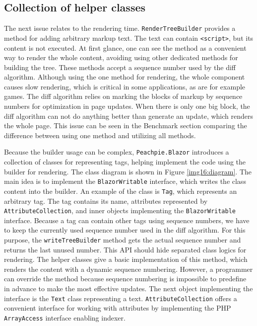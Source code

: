 \subsection{Collection of helper classes}

The next issue relates to the rendering time.
\texttt{RenderTreeBuilder} provides a method for adding arbitrary markup text.
The text can contain \texttt{<script>}, but its content is not executed.
At first glance, one can see the method as a convenient way to render the whole content, avoiding using other dedicated methods for building the tree.
These methods accept a sequence number used by the diff algorithm. 
Although using the one method for rendering, the whole component causes slow rendering, which is critical in some applications, as are for example games.
The diff algorithm relies on marking the blocks of markup by sequence numbers for optimization in page updates.
When there is only one big block, the diff algorithm can not do anything better than generate an update, which renders the whole page. 
This issue can be seen in the Benchmark section comparing the difference between using one method and utilizing all methods.
\par
Because the builder usage can be complex, \texttt{Peachpie.Blazor} introduces a collection of classes for representing tags, helping implement the code using the builder for rendering.
The class diagram is shown in Figure \ref{img16:diagram}.
The main idea is to implement the \texttt{BlazorWritable} interface, which writes the class content into the builder.
An example of the class is \texttt{Tag}, which represents an arbitrary tag.
The tag contains its name, attributes represented by \texttt{AttributeCollection}, and inner objects implementing the \texttt{BlazorWritable} interface.
Because a tag can contain other tags using sequence numbers, we have to keep the currently used sequence number used in the diff algorithm.
For this purpose, the \texttt{writeTreeBuil\-der} method gets the actual sequence number and returns the last unused number.
This API should hide separated class logics for rendering.
The helper classes give a basic implementation of this method, which renders the content with a dynamic sequence numbering. 
However, a programmer can override the method because sequence numbering is impossible to predefine in advance to make the most effective updates.
The next object implementing the interface is the \texttt{Text} class representing a text.
\texttt{AttributeCollection} offers a convenient interface for working with attributes by implementing the PHP \texttt{ArrayAccess} interface enabling indexer.
